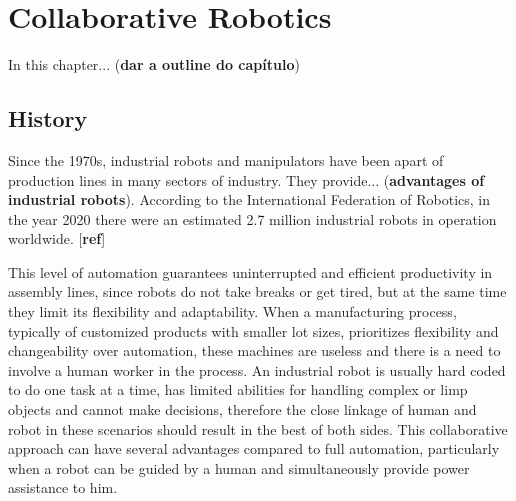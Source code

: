 \chapter{Collaborative Robotics}


\par In this chapter... (\textbf{dar a outline do capítulo})

\section{History}

\par Since the 1970s, industrial robots and manipulators have been apart of production lines in many sectors of industry. They provide... (\textbf{advantages of industrial robots}). 
According to the International Federation of Robotics, in the year 2020 there were an estimated 2.7 million industrial robots in operation worldwide. [\textbf{ref}]

\par This level of automation guarantees uninterrupted and efficient productivity in assembly lines, since robots do not take breaks or get tired, but at the same time they limit its flexibility and adaptability. When a manufacturing process, typically of customized products with smaller lot sizes, prioritizes flexibility and changeability over automation, these machines are useless and there is a need to involve a human worker in the process.
% 
An industrial robot is usually hard coded to do one task at a time, has limited abilities for handling complex or limp objects and cannot make decisions, therefore the close linkage of human and robot in these scenarios should result in the best of both sides. This collaborative approach can have several advantages compared to full automation, particularly when a robot can be guided by a human and simultaneously provide power assistance to him.


